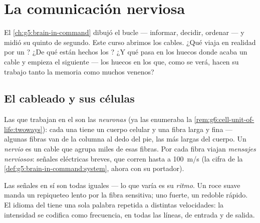 \chapter{La comunicación nerviosa}\label{ch:g8:nervous-communication}

El \cref{ch:g5:brain-in-command} dibujó el bucle --- informar, decidir,
ordenar --- y midió su quinto de segundo. Este curso abrimos los
cables. ¿Qué viaja en realidad por un ? ¿De qué están hechos los
? ¿Y qué pasa en los huecos donde acaba un cable y empieza el
siguiente --- los huecos en los que, como se verá, hacen su trabajo
tanto la memoria como muchos venenos?

\section{El cableado y sus células}

\begin{definition}\label{def:g8:nervous-communication:neuron}
Las  que trabajan en el  son las
\emph{neuronas} (ya las enumeraba la
\cref{rem:g6:cell-unit-of-life:twoways}): cada una tiene un cuerpo
celular y una fibra larga y fina --- algunas fibras van de la columna
al dedo del pie, las  más largas del cuerpo. Un
\emph{nervio} es un cable que agrupa miles de esas
fibras. Por cada fibra viajan \emph{mensajes nerviosos}: señales eléctricas breves, que corren hasta a
\qty{100}{m/s} (la cifra de la
\cref{def:g5:brain-in-command:system}, ahora con su portador).
\end{definition}

\begin{proposition}\label{prop:g8:nervous-communication:code}
Las señales en sí son todas iguales --- lo que varía es su
\emph{ritmo}. Un roce suave manda un repiqueteo lento por la fibra
sensitiva; uno fuerte, un redoble rápido. El idioma del  tiene una sola palabra repetida a distintas velocidades: la
intensidad se codifica como frecuencia, en todas las líneas, de entrada
y de salida.
\end{proposition}
\admitted

